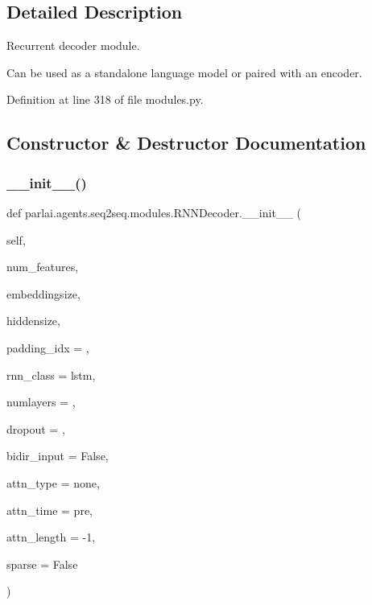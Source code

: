 \subsection{Detailed Description}
\begin{DoxyVerb}Recurrent decoder module.

Can be used as a standalone language model or paired with an encoder.
\end{DoxyVerb}
 

Definition at line 318 of file modules.\+py.



\subsection{Constructor \& Destructor Documentation}
\mbox{\label{classparlai_1_1agents_1_1seq2seq_1_1modules_1_1RNNDecoder_ac115797a89d673f99c26d1ed9fba6d30}} 
\subsubsection{\texorpdfstring{\+\_\+\+\_\+init\+\_\+\+\_\+()}{\_\_init\_\_()}}
{\footnotesize\ttfamily def parlai.\+agents.\+seq2seq.\+modules.\+R\+N\+N\+Decoder.\+\_\+\+\_\+init\+\_\+\+\_\+ (\begin{DoxyParamCaption}\item[{}]{self,  }\item[{}]{num\+\_\+features,  }\item[{}]{embeddingsize,  }\item[{}]{hiddensize,  }\item[{}]{padding\+\_\+idx = {},  }\item[{}]{rnn\+\_\+class = {\ttfamily \textquotesingle{}lstm\textquotesingle{}},  }\item[{}]{numlayers = {},  }\item[{}]{dropout = {},  }\item[{}]{bidir\+\_\+input = {\ttfamily False},  }\item[{}]{attn\+\_\+type = {\ttfamily \textquotesingle{}none\textquotesingle{}},  }\item[{}]{attn\+\_\+time = {\ttfamily \textquotesingle{}pre\textquotesingle{}},  }\item[{}]{attn\+\_\+length = {\ttfamily -\/1},  }\item[{}]{sparse = {\ttfamily False} }\end{DoxyParamCaption})}

